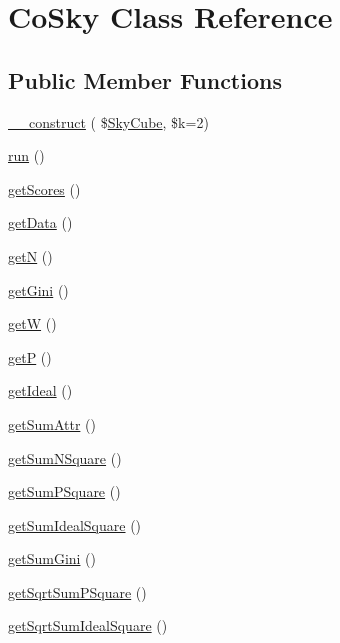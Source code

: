 \hypertarget{class_co_sky}{}\section{Co\+Sky Class Reference}
\label{class_co_sky}
\subsection*{Public Member Functions}
\begin{DoxyCompactItemize}
\item 
\hyperlink{class_co_sky_aaca40105ee346dd2f0dfb37572211782}{\+\_\+\+\_\+construct} ( \$\hyperlink{class_sky_cube}{Sky\+Cube}, \$k=2)
\item 
\hyperlink{class_co_sky_acd57d18650f195f38f620762d8e6feae}{run} ()
\item 
\hyperlink{class_co_sky_a873b1aa1f399f9545bbcaed5eab37841}{get\+Scores} ()
\item 
\hyperlink{class_co_sky_a87641b188f0af8fd8c427c29f6282856}{get\+Data} ()
\item 
\hyperlink{class_co_sky_a81b9c7c69b7f974cbab31e8f24e290e5}{getN} ()
\item 
\hyperlink{class_co_sky_a86823c8c7288ca91d882912fae1e2dbd}{get\+Gini} ()
\item 
\hyperlink{class_co_sky_af8150544b7cbed08fb4564651ff8eb97}{getW} ()
\item 
\hyperlink{class_co_sky_aa167cfe61e04f1961ea8450c79fad1ff}{getP} ()
\item 
\hyperlink{class_co_sky_a0cc4923fbeb96a5835edea9dbaf00520}{get\+Ideal} ()
\item 
\hyperlink{class_co_sky_ad4699a3e8f4ceb13f09495a4faa0b3ed}{get\+Sum\+Attr} ()
\item 
\hyperlink{class_co_sky_a6d4eb34b228caeed98cd4df68da2fd4d}{get\+Sum\+N\+Square} ()
\item 
\hyperlink{class_co_sky_a0682dc9d023c580550f35fb45a2a83cd}{get\+Sum\+P\+Square} ()
\item 
\hyperlink{class_co_sky_a3cbc22af0edf7355d1b397d10e6ea05c}{get\+Sum\+Ideal\+Square} ()
\item 
\hyperlink{class_co_sky_a37c6dc46ab3c4f8ce8577f90cbd60981}{get\+Sum\+Gini} ()
\item 
\hyperlink{class_co_sky_a7d42b59b979f2e143e80b5b4d22f16e7}{get\+Sqrt\+Sum\+P\+Square} ()
\item 
\hyperlink{class_co_sky_a2672b5893cf0a533234d3aedcbf63623}{get\+Sqrt\+Sum\+Ideal\+Square} ()
\end{DoxyCompactItemize}
